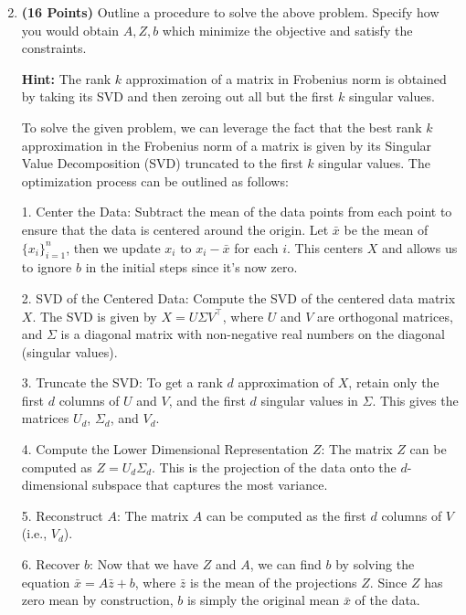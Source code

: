 \documentclass[a4paper]{article}
\theoremstyle{definition}
\newenvironment{soln}{
    \leavevmode\color{blue}\ignorespaces
}{}
\begin{document}
\begin{enumerate}
\setcounter{enumi}{1}
\item \textbf{(16 Points)}
Outline a procedure to solve the above problem. Specify how you
would obtain $A, Z, b$ which minimize the objective and satisfy the constraints.

\textbf{Hint: }The rank $k$ approximation of a matrix in Frobenius norm is obtained by
taking its SVD and then zeroing out all but the first $k$ singular values.

\begin{soln}
To solve the given problem, we can leverage the fact that the best rank \( k \) approximation in the Frobenius norm of a matrix is given by its Singular Value Decomposition (SVD) truncated to the first \( k \) singular values. The optimization process can be outlined as follows:

1. Center the Data: Subtract the mean of the data points from each point to ensure that the data is centered around the origin. Let \( \bar{x} \) be the mean of \( \{x_i\}_{i=1}^n \), then we update \( x_i \) to \( x_i - \bar{x} \) for each \( i \). This centers \( X \) and allows us to ignore \( b \) in the initial steps since it's now zero.
    
2. SVD of the Centered Data: Compute the SVD of the centered data matrix \( X \). The SVD is given by \( X = U\Sigma V^\top \), where \( U \) and \( V \) are orthogonal matrices, and \( \Sigma \) is a diagonal matrix with non-negative real numbers on the diagonal (singular values).
    
3. Truncate the SVD: To get a rank \( d \) approximation of \( X \), retain only the first \( d \) columns of \( U \) and \( V \), and the first \( d \) singular values in \( \Sigma \). This gives the matrices \( U_d \), \( \Sigma_d \), and \( V_d \).
    
4. Compute the Lower Dimensional Representation \( Z \): The matrix \( Z \) can be computed as \( Z = U_d \Sigma_d \). This is the projection of the data onto the \( d \)-dimensional subspace that captures the most variance.
    
5. Reconstruct \( A \): The matrix \( A \) can be computed as the first \( d \) columns of \( V \) (i.e., \( V_d \)).
    
6. Recover \( b \): Now that we have \( Z \) and \( A \), we can find \( b \) by solving the equation \( \bar{x} = A\bar{z} + b \), where \( \bar{z} \) is the mean of the projections \( Z \). Since \( Z \) has zero mean by construction, \( b \) is simply the original mean \( \bar{x} \) of the data.
    

\end{soln}
\end{enumerate}
\end{document}
